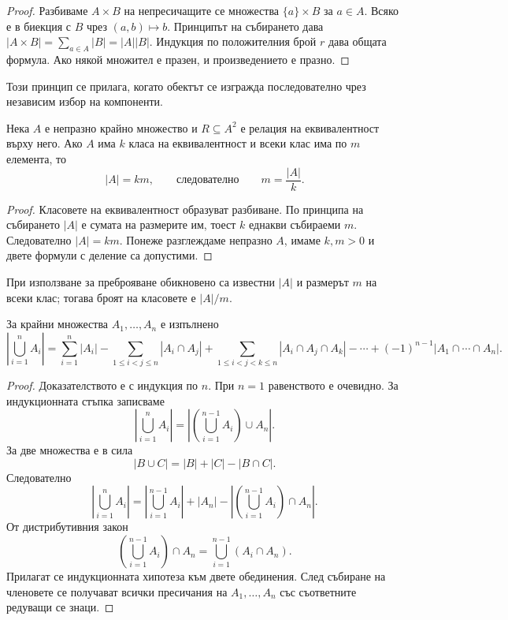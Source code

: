 \begin{proof}
Разбиваме $A\times B$ на непресичащите се множества $\{a\}\times B$ за $a\in A$. Всяко е в биекция с $B$ чрез $(a,b)\mapsto b$. Принципът на събирането дава $|A\times B|=\sum_{a\in A}|B|=|A||B|$. Индукция по положителния брой $r$ дава общата формула. Ако някой множител е празен, и произведението е празно.
\end{proof}

Този принцип се прилага, когато обектът се изгражда последователно чрез независим избор на компоненти.

\begin{keythm}
Нека $A$ е непразно крайно множество и $R\subseteq A^2$ е релация на еквивалентност върху него. Ако $A$ има $k$ класа на еквивалентност и всеки клас има по $m$ елемента, то
\[
|A|=km,
\qquad\text{следователно}\qquad
m=\frac{|A|}{k}.
\]
\end{keythm}

\begin{proof}
Класовете на еквивалентност образуват разбиване. По принципа на събирането $|A|$ е сумата на размерите им, тоест $k$ еднакви събираеми $m$. Следователно $|A|=km$. Понеже разглеждаме непразно $A$, имаме $k,m>0$ и двете формули с деление са допустими.
\end{proof}

При използване за преброяване обикновено са известни $|A|$ и размерът $m$ на всеки клас; тогава броят на класовете е $|A|/m$.

\begin{keythm}
За крайни множества $A_1,\ldots,A_n$ е изпълнено
\[
\left|\bigcup_{i=1}^{n}A_i\right|
=
\sum_{i=1}^{n}|A_i|
-\sum_{1\leq i<j\leq n}|A_i\cap A_j|
+\sum_{1\leq i<j<k\leq n}|A_i\cap A_j\cap A_k|
-\cdots
+(-1)^{n-1}|A_1\cap\cdots\cap A_n|.
\]
\end{keythm}

\begin{proof}
Доказателството е с индукция по $n$. При $n=1$ равенството е очевидно. За индукционната стъпка записваме
\[
\left|\bigcup_{i=1}^{n}A_i\right|
=
\left|\left(\bigcup_{i=1}^{n-1}A_i\right)\cup A_n\right|.
\]
За две множества е в сила
\[
|B\cup C|=|B|+|C|-|B\cap C|.
\]
Следователно
\[
\left|\bigcup_{i=1}^{n}A_i\right|
=
\left|\bigcup_{i=1}^{n-1}A_i\right|
+|A_n|
-\left|\left(\bigcup_{i=1}^{n-1}A_i\right)\cap A_n\right|.
\]
От дистрибутивния закон
\[
\left(\bigcup_{i=1}^{n-1}A_i\right)\cap A_n
=
\bigcup_{i=1}^{n-1}(A_i\cap A_n).
\]
Прилагат се индукционната хипотеза към двете обединения. След събиране на членовете се получават всички пресичания на $A_1,\ldots,A_n$ със съответните редуващи се знаци.
\end{proof}

